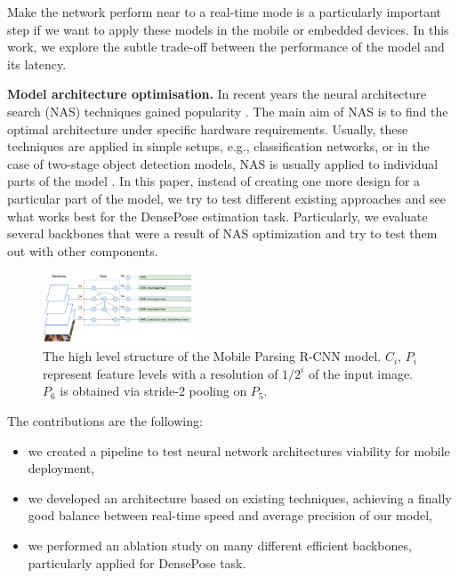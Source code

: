 Make the network perform near to a real-time mode is a particularly important step if we want to apply these models in the mobile or embedded devices. In this work, we explore the subtle trade-off between the performance of the 
model and its latency.

\noindent \textbf{Model architecture optimisation.}
In recent years the neural architecture search (NAS) techniques gained popularity \cite{automl}. The main aim of NAS is to find the optimal architecture under specific hardware requirements. Usually, these techniques are applied in simple setups, e.g., classification networks, or in the case of two-stage object detection models, NAS is usually applied to individual parts of the model \cite{nasfpn}. In this paper, instead of creating one more design for a particular part of the model, we try to test different existing approaches and see what works best for the DensePose estimation task. Particularly, we evaluate several backbones that were a result of NAS optimization and try to test them out with other components.

\begin{figure}[!hbtp]
\centering
\includegraphics[width=0.4\textwidth]{Figures/densepose/scheme.pdf}
\caption{The high level structure of the Mobile Parsing R-CNN model. $C_i$, $P_i$ represent feature levels with a resolution of $1/2^i$ of the input image. $P_6$ is obtained via stride-2 pooling on $P_5$.}
\label{fig:scheme}
\end{figure}

The contributions are the following:
\begin{itemize}
    \item we created a pipeline to test neural network architectures viability for mobile deployment,
    \item we developed an architecture based on existing techniques, achieving a finally good balance between real-time speed and average precision of our model,
    \item we performed an ablation study on many different efficient backbones, particularly applied for DensePose task.
\end{itemize}
